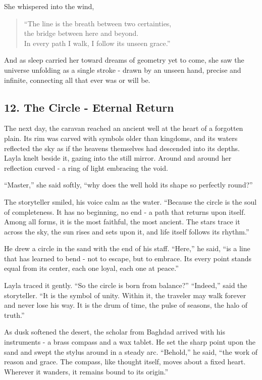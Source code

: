 \documentclass[
  letterpaper,
  DIV=11,
  numbers=noendperiod]{scrreprt}
\begin{document}
She whispered into the wind,

\begin{quote}
``The line is the breath between two certainties,\\
the bridge between here and beyond.\\
In every path I walk, I follow its unseen grace.''
\end{quote}

And as sleep carried her toward dreams of geometry yet to come, she saw
the universe unfolding as a single stroke - drawn by an unseen hand,
precise and infinite, connecting all that ever was or will be.

\subsection{12. The Circle - Eternal
Return}\label{the-circle---eternal-return}

The next day, the caravan reached an ancient well at the heart of a
forgotten plain. Its rim was carved with symbols older than kingdoms,
and its waters reflected the sky as if the heavens themselves had
descended into its depths. Layla knelt beside it, gazing into the still
mirror. Around and around her reflection curved - a ring of light
embracing the void.

``Master,'' she said softly, ``why does the well hold its shape so
perfectly round?''

The storyteller smiled, his voice calm as the water. ``Because the
circle is the soul of completeness. It has no beginning, no end - a path
that returns upon itself. Among all forms, it is the most faithful, the
most ancient. The stars trace it across the sky, the sun rises and sets
upon it, and life itself follows its rhythm.''

He drew a circle in the sand with the end of his staff. ``Here,'' he
said, ``is a line that has learned to bend - not to escape, but to
embrace. Its every point stands equal from its center, each one loyal,
each one at peace.''

Layla traced it gently. ``So the circle is born from balance?''
``Indeed,'' said the storyteller. ``It is the symbol of unity. Within
it, the traveler may walk forever and never lose his way. It is the drum
of time, the pulse of seasons, the halo of truth.''

As dusk softened the desert, the scholar from Baghdad arrived with his
instruments - a brass compass and a wax tablet. He set the sharp point
upon the sand and swept the stylus around in a steady arc. ``Behold,''
he said, ``the work of reason and grace. The compass, like thought
itself, moves about a fixed heart. Wherever it wanders, it remains bound
to its origin.''
\end{document}
